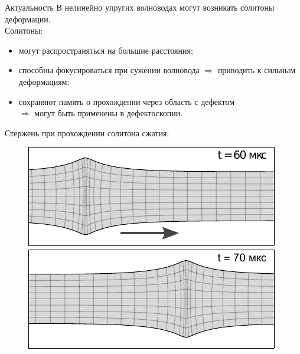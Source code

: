 \documentclass[usenames,dvipsnames]{beamer}
\begin{document}
\begin{frame}{Актуальность}
	В нелинейно упругих волноводах могут возникать солитоны деформации.\\
	\vspace{2mm}
	Солитоны:
	\begin{itemize}
		\item могут распространяться на большие расстояния;
		\item способны фокусироваться при сужении волновода $\Rightarrow$ приводить к сильным деформациям;
		\item сохраняют память о прохождении через область с дефектом\\ $\Rightarrow$ могут быть применены в дефектоскопии.
	\end{itemize}
	\vspace{2mm}
	Стержень при прохождении солитона сжатия:
	\begin{figure}
		\vspace{-2mm}
		\includegraphics[width=0.46\linewidth]{Figures/DeformedRod1}
		\hspace{5mm}
		\includegraphics[width=0.46\linewidth]{Figures/DeformedRod2}
	\end{figure}
\end{frame}
\end{document}
